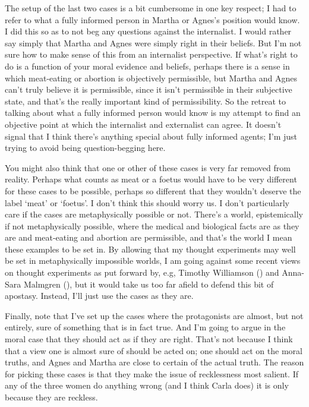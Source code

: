 \documentclass[
  10pt,
  letterpaper,
  DIV=11,
  numbers=noendperiod,
  twoside]{scrartcl}
\begin{document}
The setup of the last two cases is a bit cumbersome in one key respect;
I had to refer to what a fully informed person in Martha or Agnes's
position would know. I did this so as to not beg any questions against
the internalist. I would rather say simply that Martha and Agnes were
simply right in their beliefs. But I'm not sure how to make sense of
this from an internalist perspective. If what's right to do is a
function of your moral evidence and beliefs, perhaps there is a sense in
which meat-eating or abortion is objectively permissible, but Martha and
Agnes can't truly believe it is permissible, since it isn't permissible
in their subjective state, and that's the really important kind of
permissibility. So the retreat to talking about what a fully informed
person would know is my attempt to find an objective point at which the
internalist and externalist can agree. It doesn't signal that I think
there's anything special about fully informed agents; I'm just trying to
avoid being question-begging here.

You might also think that one or other of these cases is very far
removed from reality. Perhaps what counts as meat or a foetus would have
to be very different for these cases to be possible, perhaps so
different that they wouldn't deserve the label `meat' or `foetus'. I
don't think this should worry us. I don't particularly care if the cases
are metaphysically possible or not. There's a world, epistemically if
not metaphysically possible, where the medical and biological facts are
as they are and meat-eating and abortion are permissible, and that's the
world I mean these examples to be set in. By allowing that my thought
experiments may well be set in metaphysically impossible worlds, I am
going against some recent views on thought experiments as put forward
by, e.g, Timothy Williamson
() and Anna-Sara Malmgren
(), but it would take us too far afield
to defend this bit of apostasy. Instead, I'll just use the cases as they
are.

Finally, note that I've set up the cases where the protagonists are
almost, but not entirely, sure of something that is in fact true. And
I'm going to argue in the moral case that they should act as if they are
right. That's not because I think that a view one is almost sure of
should be acted on; one should act on the moral truths, and Agnes and
Martha are close to certain of the actual truth. The reason for picking
these cases is that they make the issue of recklessness most salient. If
any of the three women do anything wrong (and I think Carla does) it is
only because they are reckless.
\end{document}
